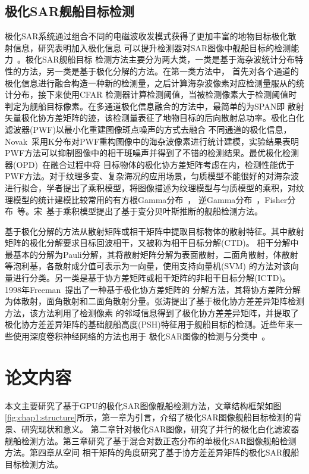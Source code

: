   \subsection{极化SAR舰船目标检测}
      极化SAR系统通过组合不同的电磁波收发模式获得了更加丰富的地物目标极化散射信息，研究表明加入极化信息
      可以提升检测器对SAR图像中舰船目标的检测能力~\cite{18677,Touzi2015Optimization}。极化SAR舰船目标
      检测方法主要分为两大类，一类是基于海杂波统计分布特性的方法，另一类是基于极化分解的方法。在第一类方法中，
      首先对各个通道的极化信息进行融合构造一种新的检测量，之后计算海杂波像素对应检测量服从的统计分布，接下来使用CFAR
      检测器计算检测阈值，当被检测像素大于检测阈值时判定为舰船目标像素。在多通道极化信息融合的方法中，最简单的为SPAN即
      散射矢量极化协方差矩阵的迹，该检测量表征了地物目标的后向散射总功率。极化白化滤波器(PWF)以最小化重建图像斑点噪声的方式去融合
      不同通道的极化信息，Novak~\cite{Novak1990Optimal}采用K分布对PWF重构图像中的海杂波像素进行统计建模，实验结果表明
      PWF方法可以抑制图像中的相干斑噪声并得到了不错的检测结果。最优极化检测器(OPD)~\cite{18677}在融合过程中将
      目标物体的极化协方差矩阵考虑在内，检测性能优于PWF方法。对于纹理多变、复杂海况的应用场景，匀质模型不能很好的对海杂波
      进行拟合，学者提出了乘积模型，将图像描述为纹理模型与匀质模型的乘积，对纹理模型的统计建模比较常用的有方根Gamma分布~\cite{Lee1994K}，
      逆Gamma分布~\cite{Freitas2005The}，Fisher分布~\cite{Bombrun2008Segmentation}等。宋~\cite{Song2017Ship}基于乘积模型提出了基于变分贝叶斯推断的舰船检测方法。

      基于极化分解的方法从散射矩阵或相干矩阵中提取目标物体的散射特征。其中散射矩阵的极化分解要求目标回波相干，又被称为相干目标分解(CTD)。
      相干分解中最基本的分解为Pauli分解，其将散射矩阵分解为表面散射，二面角散射，体散射等泡利基，各散射成分值可表示为一向量，使用支持向量机(SVM)
      的方法对该向量进行分类。另一类是基于协方差矩阵或相干矩阵的非相干目标分解(ICTD)。1998年Freeman~\cite{673687}提出了一种基于极化协方差矩阵的
      分解方法，其将协方差阵分解为体散射，面角散射和二面角散射分量。张涛\cite{Tao2017PolSAR}提出了基于极化协方差差异矩阵检测方法，该方法利用了检测像素
      的邻域信息得到了极化协方差差异矩阵，并提取了极化协方差差异矩阵的基础舰船高度(PSH)特征用于舰船目标的检测。近些年来一些使用深度卷积神经网络的方法也用于
      极化SAR图像的检测与分类中~\cite{徐丰2017深度学习在}。


\section{论文内容}
  本文主要研究了基于GPU的极化SAR图像舰船检测方法，文章结构框架如图\ref{fig:chap1:structure}所示，第一章为引言，介绍了极化SAR图像舰船目标检测的背景、研究现状和意义。
  第二章针对极化SAR图像，研究了并行的极化白化滤波器舰船检测方法。第三章研究了基于混合对数正态分布的单极化SAR图像舰船检测方法。第四章从空间
  相干矩阵的角度研究了基于协方差差异矩阵的极化SAR舰船目标检测方法。


